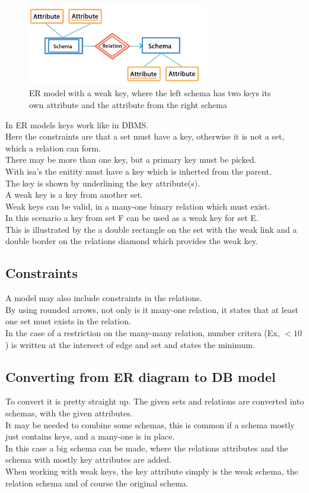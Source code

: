 \documentclass[12pt, a4paper]{article}
\begin{document}
		\begin{figure}[h]
			\centering
			\caption{ER model with a weak key, where the left schema has two keys its own attribute and the attribute from the right schema}
			\includegraphics[width=300px]{assets/ERWeak.png}
		\end{figure}
			In ER models keys work like in DBMS.\\
			Here the constraints are that a set must have a key, otherwise it is not a set, which a relation can form.\\
			There may be more than one key, but a primary key must be picked.\\
			With isa's the enitity must have a key which is inherted from the parent.\\
			The key is shown by underlining the key attribute(s).\\
			A weak key is a key from another set.\\
			Weak keys can be valid, in a many-one binary relation which must exist.\\
			In this scenario a key from set F can be used as a weak key for set E.\\
			This is illustrated by the a double rectangle on the set with the weak link and a double border on the relations diamond which provides the weak key.
		\subsection{Constraints}
			A model may also include constraints in the relations.\\
			By using rounded arrows, not only is it many-one relation, it states that at least one set must exists in the relation.\\
			In the case of a restriction on the many-many relation, number critera (Ex, $<10$) is written at the intersect of edge and set and states the minimum.
		\subsection{Converting from ER diagram to DB model}
			To convert it is pretty straight up. The given sets and relations are converted into schemas, with the given attributes.\\
			It may be needed to combine some schemas, this is common if a schema mostly just contains keys, and a many-one is in place.\\
			In this case a big schema can be made, where the relations attributes and the schema with mostly key attributes are added.\\
			When working with weak keys, the key attribute simply is the weak schema, the relation schema and of course the original schema.
\end{document}
